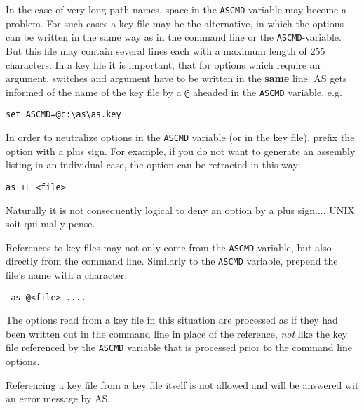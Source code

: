 \documentclass[12pt,twoside]{report}
\newcommand{\bb}[1]{{\bf #1}}
\newcommand{\tty}[1]{{\tt #1}}
\begin{document}
In the case of very long path names, space in the \tty{ASCMD} variable may
become a problem.  For such cases a key file may be the alternative,
in which the options can be written in the same way as in the command
line or the \tty{ASCMD}-variable.  But this file may contain several lines
each with a maximum length of 255 characters.  In a key file it is
important, that for options which require an argument, switches and
argument have to be written in the \bb{same} line.  AS gets informed of
the name of the key file by a \tty{@} aheaded in the \tty{ASCMD} variable,
e.g.
\begin{verbatim}
set ASCMD=@c:\as\as.key
\end{verbatim}
In order to neutralize options in the \tty{ASCMD} variable (or in the 
key file), prefix the option with a plus sign.  For example, if you
do not want to generate an assembly listing in an individual case,
the option can be retracted in this way:
\begin{verbatim}
as +L <file>
\end{verbatim}
Naturally it is not consequently logical to deny an option by a 
plus sign....  UNIX soit qui mal y pense.

References to key files may not only come from the {\tt ASCMD} variable,
but also directly from the command line.  Similarly to the {\tt ASCMD}
variable, prepend the file's name with a \@ character:
\begin{verbatim} 
 as @<file> ....
\end{verbatim}
The options read from a key file in this situation are processed as if
they had been written out in the command line in place of the reference,
{\em not} like the key file referenced by the {\tt ASCMD} variable that is
processed prior to the command line options.

Referencing a key file from a key file itself is not allowed and will be
answered wit an error message by AS.
\end{document}
